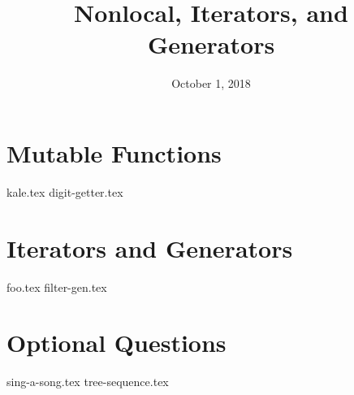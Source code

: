 \documentclass{exam}
\title{Nonlocal, Iterators, and Generators}
\date{October 1, 2018}
\begin{document}
\maketitle

\section{Mutable Functions}
\begin{questions}
{kale.tex}
\newpage
{digit-getter.tex}
\end{questions}

\section{Iterators and Generators}
\begin{questions}
{foo.tex}
\newpage
{filter-gen.tex}
\end{questions}

\newpage

\section{Optional Questions}
\begin{questions}
{sing-a-song.tex}
\newpage
{tree-sequence.tex}
\end{questions}
\end{document}

